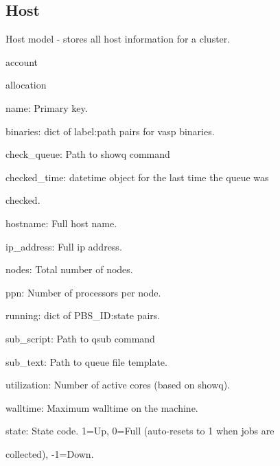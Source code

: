 \documentclass[letterpaper,10pt,english]{sphinxmanual}
\begin{document}
\subsection{Host}
\label{models:host}

\begin{fulllineitems}
\label{models:qmpy.Host}
Host model - stores all host information for a cluster.
\begin{description}
\item[{Relationships:}] \leavevmode
\begin{DUlineblock}{0em}
\item[] account
\item[] allocation
\end{DUlineblock}

\item[{Attributes:}] \leavevmode
\begin{DUlineblock}{0em}
\item[] name: Primary key.
\item[] binaries: dict of label:path pairs for vasp binaries.
\item[] check\_queue: Path to showq command
\item[] checked\_time: datetime object for the last time the queue was 
\item[]
\begin{DUlineblock}{\DUlineblockindent}
\item[] checked.
\end{DUlineblock}
\item[] hostname: Full host name. 
\item[] ip\_address: Full ip address.
\item[] nodes: Total number of nodes.
\item[] ppn: Number of processors per node.
\item[] running: dict of PBS\_ID:state pairs.
\item[] sub\_script: Path to qsub command
\item[] sub\_text: Path to queue file template.
\item[] utilization: Number of active cores (based on showq).
\item[] walltime: Maximum walltime on the machine.
\item[] state: State code. 1=Up, 0=Full (auto-resets to 1 when jobs are
\item[]
\begin{DUlineblock}{\DUlineblockindent}
\item[] collected), -1=Down.
\end{DUlineblock}
\end{DUlineblock}


\end{description}
\end{fulllineitems}
\end{document}
